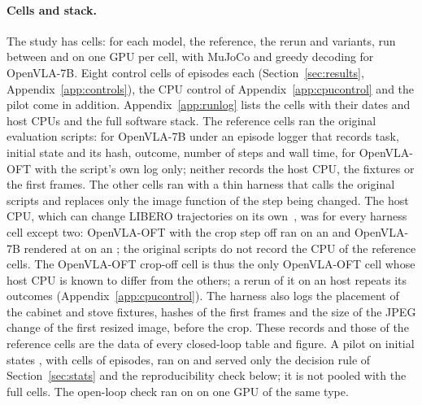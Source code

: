 \paragraph{Cells and stack.} The study has \NCells{} cells: for each model, the reference, the rerun and \NVariants{} variants, run between \FirstRunDate{} and \LastRunDate{} \Year{} on one \GpuName{} GPU per cell, with MuJoCo \MujocoVersion{} and greedy decoding for OpenVLA-7B. Eight control cells of \NPairs{} episodes each (Section~\ref{sec:results}, Appendix~\ref{app:controls}), the CPU control of Appendix~\ref{app:cpucontrol} and the pilot come in addition. Appendix~\ref{app:runlog} lists the cells with their dates and host CPUs and the full software stack. The reference cells ran the original evaluation scripts: for OpenVLA-7B under an episode logger that records task, initial state and its hash, outcome, number of steps and wall time, for OpenVLA-OFT with the script's own log only; neither records the host CPU, the fixtures or the first frames. The other cells ran with a thin harness that calls the original scripts and replaces only the image function of the step being changed. The host CPU, which can change LIBERO trajectories on its own~\citep{jiang2026bench}, was \CpuMain{} for every harness cell except two: OpenVLA-OFT with the crop step off ran on an \CpuOftCrop{} and OpenVLA-7B rendered at \InputRes{} on an \CpuSevRend; the original scripts do not record the CPU of the reference cells. The OpenVLA-OFT crop-off cell is thus the only OpenVLA-OFT cell whose host CPU is known to differ from the others; a rerun of it on an \CpuMain{} host repeats its outcomes (Appendix~\ref{app:cpucontrol}).\HookCpuSetup{}
The harness also logs the placement of the cabinet and stove fixtures, hashes of the first frames and the size of the JPEG change of the first resized image, before the crop. These records and those of the reference cells are the data of every closed-loop table and figure. A pilot on initial states \SplitA, with \PilotCells{} cells of \PilotPairs{} episodes, ran on \PilotDate{} and served only the decision rule of Section~\ref{sec:stats} and the reproducibility check below; it is not pooled with the full cells. The open-loop check ran on \OlDates{} \Year{} on one GPU of the same type.

